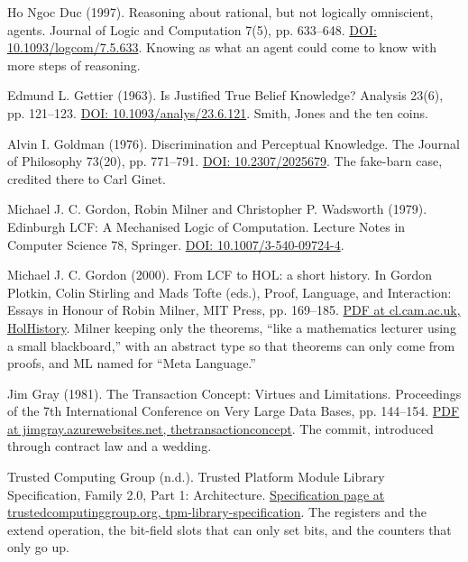 \documentclass[11pt,twoside]{article}
\theoremstyle{thielethm}
\theoremstyle{thieledef}
\theoremstyle{thieledef}
\theoremstyle{thieledef}
\theoremstyle{thielethm}
\theoremstyle{thieleobs}
\theoremstyle{thielethm}
\begin{document}
\noindent Ho Ngoc Duc (1997). Reasoning about rational, but not logically omniscient, agents. Journal of Logic and Computation 7(5), pp. 633--648. \href{https://doi.org/10.1093/logcom/7.5.633}{DOI: 10.1093/logcom/7.5.633}. Knowing as what an agent could come to know with more steps of reasoning.
\par\medskip

\noindent Edmund L. Gettier (1963). Is Justified True Belief Knowledge? Analysis 23(6), pp. 121--123. \href{https://doi.org/10.1093/analys/23.6.121}{DOI: 10.1093/analys/23.6.121}. Smith, Jones and the ten coins.
\par\medskip

\noindent Alvin I. Goldman (1976). Discrimination and Perceptual Knowledge. The Journal of Philosophy 73(20), pp. 771--791. \href{https://doi.org/10.2307/2025679}{DOI: 10.2307/2025679}. The fake-barn case, credited there to Carl Ginet.
\par\medskip

\noindent Michael J. C. Gordon, Robin Milner and Christopher P. Wadsworth (1979). Edinburgh LCF: A Mechanised Logic of Computation. Lecture Notes in Computer Science 78, Springer. \href{https://doi.org/10.1007/3-540-09724-4}{DOI: 10.1007/3-540-09724-4}.
\par\medskip

\noindent Michael J. C. Gordon (2000). From LCF to HOL: a short history. In Gordon Plotkin, Colin Stirling and Mads Tofte (eds.), Proof, Language, and Interaction: Essays in Honour of Robin Milner, MIT Press, pp. 169--185. \href{https://www.cl.cam.ac.uk/archive/mjcg/papers/HolHistory.pdf}{PDF at cl.cam.ac.uk, HolHistory}. Milner keeping only the theorems, ``like a mathematics lecturer using a small blackboard,'' with an abstract type so that theorems can only come from proofs, and ML named for ``Meta Language.''
\par\medskip

\noindent Jim Gray (1981). The Transaction Concept: Virtues and Limitations. Proceedings of the 7th International Conference on Very Large Data Bases, pp. 144--154. \href{https://jimgray.azurewebsites.net/papers/thetransactionconcept.pdf}{PDF at jimgray.azurewebsites.net, thetransactionconcept}. The commit, introduced through contract law and a wedding.
\par\medskip

\noindent Trusted Computing Group (n.d.). Trusted Platform Module Library Specification, Family 2.0, Part 1: Architecture. \href{https://trustedcomputinggroup.org/resource/tpm-library-specification/}{Specification page at trustedcomputinggroup.org, tpm-library-specification}. The registers and the extend operation, the bit-field slots that can only set bits, and the counters that only go up.
\par\medskip
\end{document}
